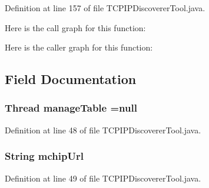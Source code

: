 Definition at line 157 of file T\+C\+P\+I\+P\+Discoverer\+Tool.\+java.



Here is the call graph for this function\+:




Here is the caller graph for this function\+:




\subsection{Field Documentation}
\hypertarget{class_t_c_p_i_p___discoverer_1_1_t_c_p_i_p_discoverer_tool_afd7a98c0d68f0137ffa1681cb3cdd804}{}
\subsubsection[{manage\+Table}]{\setlength{\rightskip}{0pt plus 5cm}Thread manage\+Table =null\hspace{0.3cm}{\ttfamily [static]}}\label{class_t_c_p_i_p___discoverer_1_1_t_c_p_i_p_discoverer_tool_afd7a98c0d68f0137ffa1681cb3cdd804}


Definition at line 48 of file T\+C\+P\+I\+P\+Discoverer\+Tool.\+java.

\hypertarget{class_t_c_p_i_p___discoverer_1_1_t_c_p_i_p_discoverer_tool_a51f2041f18e3e354b2eca28865776649}{}
\subsubsection[{mchip\+Url}]{\setlength{\rightskip}{0pt plus 5cm}String mchip\+Url\hspace{0.3cm}{\ttfamily [static]}}\label{class_t_c_p_i_p___discoverer_1_1_t_c_p_i_p_discoverer_tool_a51f2041f18e3e354b2eca28865776649}


Definition at line 49 of file T\+C\+P\+I\+P\+Discoverer\+Tool.\+java.

